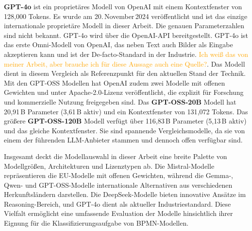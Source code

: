 \textbf{GPT-4o} \cite{openai-hello-gpt-4o} ist ein proprietäres Modell von OpenAI mit einem Kontextfenster von 128{,}000 Tokens. Es wurde am 20.\,November\,2024 veröffentlicht und ist das einzige internationale proprietäre Modell in dieser Arbeit. Die genauen Parameterzahlen sind nicht bekannt. GPT-4o wird über die OpenAI-API bereitgestellt. GPT-4o ist das erste Omni-Modell von OpenAI, das neben Text auch Bilder als Eingabe akzeptieren kann und ist der De-facto-Standard in der Industrie. \textcolor{orange}{Ich weiß das von meiner Arbeit, aber brauche ich für diese Aussage auch eine Quelle?}. Das Modell dient in diesem Vergleich als Referenzpunkt für den aktuellen Stand der Technik. Mit den GPT-OSS Modellen \cite{OpenAI_GPTOSS_ModelCard_2025} hat OpenAI zudem zwei Modelle mit offenen Gewichten und unter Apache-2.0-Lizenz veröffentlicht, die explizit für Forschung und kommerzielle Nutzung freigegeben sind. Das \textbf{GPT-OSS-20B} Modell hat 20,91\,B Parameter (3,61\,B aktiv) und ein Kontextfenster von 131{,}072 Tokens. Das größere \textbf{GPT-OSS-120B} Modell verfügt über 116,83\,B Parameter (5,13\,B aktiv) und das gleiche Kontextfenster. Sie sind spannende Vergleichsmodelle, da sie von einem der führenden \ac{LLM}-Anbieter stammen und dennoch offen verfügbar sind.

Insgesamt deckt die Modellauswahl in dieser Arbeit eine breite Palette von Modellgrößen, Architekturen und Lizenztypen ab. Die Mistral-Modelle repräsentieren die \ac{EU}-Modelle mit offenen Gewichten, während die Gemma-, Qwen- und GPT-OSS-Modelle internationale Alternativen aus verschiedenen Herkunftsländern darstellen. Die DeepSeek-Modelle bieten innovative Ansätze im Reasoning-Bereich, und GPT-4o dient als aktueller Industriestandard. Diese Vielfalt ermöglicht eine umfassende Evaluation der Modelle hinsichtlich ihrer Eignung für die Klassifizierungsaufgabe von \ac{BPMN}-Modellen.